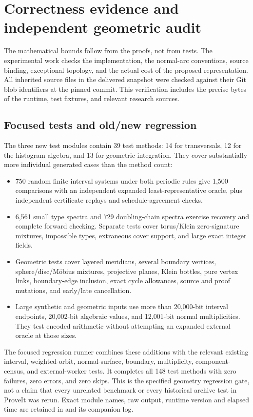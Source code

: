 \section{Correctness evidence and independent geometric audit}
\label{sec:validation}

The mathematical bounds follow from the proofs, not from tests. The
experimental work checks the implementation, the normal-arc conventions,
source binding, exceptional topology, and the actual cost of the proposed
representation. All inherited source files in the delivered snapshot were
checked against their Git blob identifiers at the pinned commit. This
verification includes the precise bytes of the runtime, test fixtures,
and relevant research sources.

\subsection{Focused tests and old/new regression}

The three new test modules contain 39 test methods: 14 for transversals,
12 for the histogram algebra, and 13 for geometric integration. They cover
substantially more individual generated cases than the method count:
\begin{itemize}
\item 750 random finite interval systems under both periodic rules give
1,500 comparisons with an independent expanded least-representative oracle,
plus independent certificate replays and schedule-agreement checks.
\item 6,561 small type spectra and 729 doubling-chain spectra exercise
recovery and complete forward checking. Separate tests cover torus/Klein
zero-signature mixtures, impossible types, extraneous cover support, and
large exact integer fields.
\item Geometric tests cover layered meridians, several boundary vertices,
sphere/disc/M\"obius mixtures, projective planes, Klein bottles, pure vertex
links, boundary-edge inclusion, exact cycle allowances, source and proof
mutations, and early/late cancellation.
\item Large synthetic and geometric inputs use more than 20,000-bit
interval endpoints, 20,002-bit algebraic values, and 12,001-bit normal
multiplicities. They test encoded arithmetic without attempting an
expanded external oracle at those sizes.
\end{itemize}

The focused regression runner combines these additions with the relevant
existing interval, weighted-orbit, normal-surface, boundary, multiplicity,
component-census, and external-worker tests. It completes all 148 test
methods with zero failures, zero errors, and zero skips. This is the
specified geometry regression gate, not a claim that every unrelated
benchmark or every historical archive test in ProveIt was rerun. Exact
module names, raw output, runtime version and elapsed time are retained in
 and its companion log.

